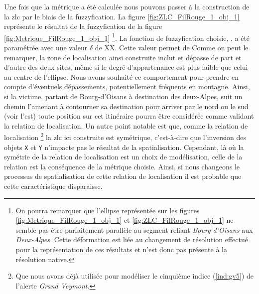 Une fois que la métrique a été calculée nous pouvons passer à la
construction de la \ac{zlc} par le biais de la fuzzyfication. La
figure \ref{fig:ZLC_FilRouge_1_obj_1} représente le résultat de la
fuzzyfication de la figure \ref{fig:Metrique_FilRouge_1_obj_1}
\footnote{On pourra remarquer que l'ellipse représentée sur les
  figures \ref{fig:Metrique_FilRouge_1_obj_1} et
  \ref{fig:ZLC_FilRouge_1_obj_1} ne semble pas être parfaitement
  parallèle au segment reliant \emph{Bourg-d'Oisans} aux
  \emph{Deux-Alpes.} Cette déformation est liée au changement de
  résolution effectué pour la représentation de ces résultats et n'est
  donc pas présente à la résolution native.}.
%
La fonction de fuzzyfication choisie, , a été
paramétrée avec une valeur \(\delta\) de XX. Cette valeur permet de 
%
Comme on peut le remarquer, la zone de localisation ainsi construite
inclut et dépasse de part et d'autre des deux sites, même si le degré
d'appartenance est plus faible que celui au centre de l'ellipse. Nous
avons souhaité ce comportement pour prendre en compte d'éventuels
dépassements, potentiellement fréquents en montagne. Ainsi, si la
victime, partant de Bourg-d'Oisans à destination des deux-Alpes, suit
un chemin l'amenant à contourner sa destination pour arriver par le
nord ou le sud (voir l'est) toute position sur cet itinéraire pourra
être considérée comme validant la relation de localisation.
%
Un autre point notable est que, comme la relation de localisation
 \footnote{Que nous avons déjà utilisée
  pour modéliser le cinquième indice (\ref{ind:gv5}) de l'alerte
  \emph{Grand Veymont.}} la \ac{zlc} ici construite est symétrique,
c'est-à-dire que l'inversion des objets \texttt{X} et \texttt{Y}
n'impacte pas le résultat de la spatialisation. Cependant, là où la
symétrie de la relation de localisation 
est un choix de modélisation, celle de la relation
 est la conséquence
de la métrique choisie. Ainsi, si nous changeons le processus de
spatialisation de cette relation de localisation il est probable que
cette caractéristique disparaisse.

